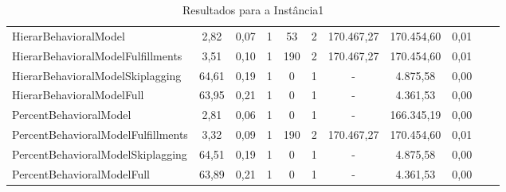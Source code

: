\begin{table}[h!]
{\begin{tabular}{lcccccccccc}
			HierarBehavioralModel                                                       & 2,82  & 0,07 & 1 & 53  & 2 & 170.467,27 & 170.454,60 & 0,01 \\
			HierarBehavioralModelFulfillments                                           & 3,51  & 0,10 & 1 & 190 & 2 & 170.467,27 & 170.454,60 & 0,01 \\
			HierarBehavioralModelSkiplagging                                            & 64,61 & 0,19 & 1 & 0   & 1 & -          & 4.875,58   & 0,00 \\
			HierarBehavioralModelFull                                                   & 63,95 & 0,21 & 1 & 0   & 1 & -          & 4.361,53   & 0,00 \\ \hline
			PercentBehavioralModel                                                      & 2,81  & 0,06 & 1 & 0   & 1 & -          & 166.345,19 & 0,00 \\
			PercentBehavioralModelFulfillments                                          & 3,32  & 0,09 & 1 & 190 & 2 & 170.467,27 & 170.454,60 & 0,01 \\
			PercentBehavioralModelSkiplagging                                           & 64,51 & 0,19 & 1 & 0   & 1 & -          & 4.875,58   & 0,00 \\
			PercentBehavioralModelFull                                                  & 63,89 & 0,21 & 1 & 0   & 1 & -          & 4.361,53   & 0,00 \\ \hline
		\end{tabular}%
	}
	\caption{Resultados para a Instância1}
	\label{tab:resul_instan1}
\end{table}


